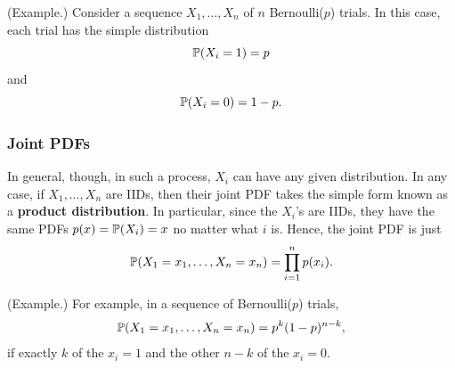 \begin{mdframed}[]
    (Example.) Consider a sequence $X_1, \dots, X_n$ of $n$ Bernoulli($p$) trials. In this case, each trial has the simple distribution 
    \[\mathbb{P}(X_i = 1) = p\]
    and 
    \[\mathbb{P}(X_i = 0) = 1 - p.\]
\end{mdframed}

\subsubsection{Joint PDFs}
In general, though, in such a process, $X_i$ can have any given distribution. In any case, if $X_1, \dots, X_n$ are IIDs, then their joint PDF takes the simple form known as a \textbf{product distribution}. In particular, since the $X_i$'s are IIDs, they have the same PDFs $p(x) = \mathbb{P}(X_i) = x$ no matter what $i$ is. Hence, the joint PDF is just 
\[\mathbb{P}(X_1 = x_1, \dots, X_n = x_n) = \prod_{i = 1}^{n} p(x_i).\]

\begin{mdframed}[]
    (Example.) For example, in a sequence of Bernoulli($p$) trials, 
    \[\mathbb{P}(X_1 = x_1, \dots, X_n = x_n) = p^k (1 - p)^{n - k},\]
    if exactly $k$ of the $x_i = 1$ and the other $n - k$ of the $x_i = 0$. 
\end{mdframed}


